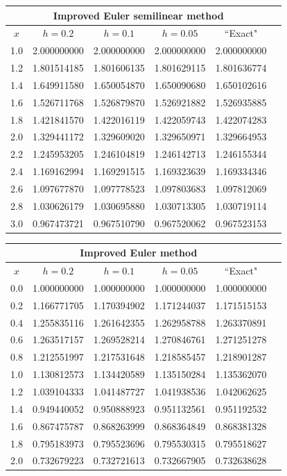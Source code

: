 \documentclass[dvips]{book}
\renewcommand{\exer}[1]{\par\medskip\;\noindent{\color{red}\bf #1.}}
\numberwithin{example}{section}
\numberwithin{equation}{section}
\numberwithin{theorem}{section}
\numberwithin{table}{section}
\numberwithin{figure}{section}
\begin{document}
{\small
\begin{tabular}{|c|r|r|r|r|r|}
\hline
\multicolumn{5}{|c|}{Improved Euler semilinear method}\\
\hline
\multicolumn{1}{|c|}{$x$}&
\multicolumn{1}{|c|}{$h=0.2$}&
\multicolumn{1}{|c|}{$h=0.1$}&
\multicolumn{1}{|c|}{$h=0.05$}&
\multicolumn{1}{|c|}{``Exact"}\\ \hline
1.0 & 2.000000000 & 2.000000000 & 2.000000000 & 2.000000000 \\
1.2 & 1.801514185 & 1.801606135 & 1.801629115 & 1.801636774 \\
1.4 & 1.649911580 & 1.650054870 & 1.650090680 & 1.650102616 \\
1.6 & 1.526711768 & 1.526879870 & 1.526921882 & 1.526935885 \\
1.8 & 1.421841570 & 1.422016119 & 1.422059743 & 1.422074283 \\
2.0 & 1.329441172 & 1.329609020 & 1.329650971 & 1.329664953 \\
2.2 & 1.245953205 & 1.246104819 & 1.246142713 & 1.246155344 \\
2.4 & 1.169162994 & 1.169291515 & 1.169323639 & 1.169334346 \\
2.6 & 1.097677870 & 1.097778523 & 1.097803683 & 1.097812069 \\
2.8 & 1.030626179 & 1.030695880 & 1.030713305 & 1.030719114 \\
3.0 & 0.967473721 & 0.967510790 & 0.967520062 & 0.967523153 \\
\hline
\end{tabular}}


\exer{3.2.18}
{\small
\begin{tabular}{|c|r|r|r|r|r|}
\hline
\multicolumn{5}{|c|}{Improved Euler method}\\\hline
\multicolumn{1}{|c|}{$x$}&
\multicolumn{1}{|c|}{$h=0.2$}&
\multicolumn{1}{|c|}{$h=0.1$}&
\multicolumn{1}{|c|}{$h=0.05$}&
\multicolumn{1}{|c|}{``Exact"}\\ \hline
0.0 & 1.000000000 & 1.000000000 & 1.000000000 & 1.000000000 \\
0.2 & 1.166771705 & 1.170394902 & 1.171244037 & 1.171515153 \\
0.4 & 1.255835116 & 1.261642355 & 1.262958788 & 1.263370891 \\
0.6 & 1.263517157 & 1.269528214 & 1.270846761 & 1.271251278 \\
0.8 & 1.212551997 & 1.217531648 & 1.218585457 & 1.218901287 \\
1.0 & 1.130812573 & 1.134420589 & 1.135150284 & 1.135362070 \\
1.2 & 1.039104333 & 1.041487727 & 1.041938536 & 1.042062625 \\
1.4 & 0.949440052 & 0.950888923 & 0.951132561 & 0.951192532 \\
1.6 & 0.867475787 & 0.868263999 & 0.868364849 & 0.868381328 \\
1.8 & 0.795183973 & 0.795523696 & 0.795530315 & 0.795518627 \\
2.0 & 0.732679223 & 0.732721613 & 0.732667905 & 0.732638628 \\
\hline
\end{tabular}}
\end{document}
